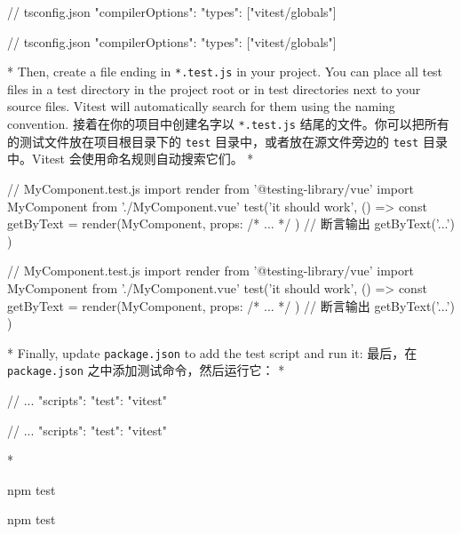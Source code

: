 \begin{paracol}{2}
\begin{codeJson}
// tsconfig.json
{
  "compilerOptions": {
    "types": ["vitest/globals"]
  }
}
\end{codeJson}
\switchcolumn
\begin{codeJson}
// tsconfig.json
{
  "compilerOptions": {
    "types": ["vitest/globals"]
  }
}
\end{codeJson}
\switchcolumn[0]*%
Then, create a file ending in \texttt{*.test.js} in your project. You
can place all test files in a test directory in the project root or in
test directories next to your source files. Vitest will automatically
search for them using the naming convention.
\switchcolumn
接着在你的项目中创建名字以 \texttt{*.test.js}
结尾的文件。你可以把所有的测试文件放在项目根目录下的 \texttt{test}
目录中，或者放在源文件旁边的 \texttt{test} 目录中。Vitest
会使用命名规则自动搜索它们。
\switchcolumn[0]*%
\begin{codeJs}
// MyComponent.test.js
import { render } from '@testing-library/vue'
import MyComponent from './MyComponent.vue'
test('it should work', () => {
  const { getByText } = render(MyComponent, {
    props: {
      /* ... */
    }
  })
  // 断言输出
  getByText('...')
})
\end{codeJs}
\switchcolumn
\begin{codeJs}
// MyComponent.test.js
import { render } from '@testing-library/vue'
import MyComponent from './MyComponent.vue'
test('it should work', () => {
  const { getByText } = render(MyComponent, {
    props: {
      /* ... */
    }
  })
  // 断言输出
  getByText('...')
})
\end{codeJs}
\switchcolumn[0]*%
Finally, update \texttt{package.json} to add the test script and run it:
\switchcolumn
最后，在 \texttt{package.json} 之中添加测试命令，然后运行它：
\switchcolumn[0]*%
\begin{codeJson}
{
  // ...
  "scripts": {
    "test": "vitest"
  }
}
\end{codeJson}  
\switchcolumn
\begin{codeJson}
{
  // ...
  "scripts": {
    "test": "vitest"
  }
}
\end{codeJson}  
\switchcolumn[0]*%
\begin{codeShell}
npm test
\end{codeShell}  
\switchcolumn
\begin{codeShell}
npm test
\end{codeShell}  
\end{paracol}


